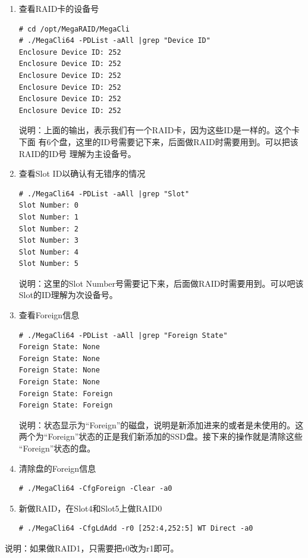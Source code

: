 \begin{enumerate}[itemsep=0pt,parsep=0pt]
\item 查看RAID卡的设备号
\small{
\begin{verbatim}
# cd /opt/MegaRAID/MegaCli
# ./MegaCli64 -PDList -aAll |grep "Device ID"
Enclosure Device ID: 252
Enclosure Device ID: 252 
Enclosure Device ID: 252
Enclosure Device ID: 252
Enclosure Device ID: 252
Enclosure Device ID: 252
\end{verbatim}
}
\normalsize

说明：上面的输出，表示我们有一个RAID卡，因为这些ID是一样的。这个卡下面
有6个盘，这里的ID号需要记下来，后面做RAID时需要用到。可以把该RAID的ID号
理解为主设备号。
	
\item 查看Slot ID以确认有无错序的情况
\small{
\begin{verbatim}
# ./MegaCli64 -PDList -aAll |grep "Slot"  
Slot Number: 0
Slot Number: 1
Slot Number: 2
Slot Number: 3
Slot Number: 4
Slot Number: 5
\end{verbatim}
}
\normalsize

说明：这里的Slot Number号需要记下来，后面做RAID时需要用到。可以吧该
Slot的ID理解为次设备号。
	
\item 查看Foreign信息
\small{
\begin{verbatim}
# ./MegaCli64 -PDList -aAll |grep "Foreign State"
Foreign State: None
Foreign State: None 
Foreign State: None
Foreign State: None
Foreign State: Foreign 
Foreign State: Foreign 
\end{verbatim}
}
\normalsize

说明：状态显示为“Foreign”的磁盘，说明是新添加进来的或者是未使用的。这
两个为“Foreign”状态的正是我们新添加的SSD盘。接下来的操作就是清除这些
“Foreign”状态的盘。
	
\item 清除盘的Foreign信息
\small{
\begin{verbatim}
# ./MegaCli64 -CfgForeign -Clear -a0
\end{verbatim}
}
\normalsize
	
\item 新做RAID，在Slot4和Slot5上做RAID0
\small{
\begin{verbatim}
# ./MegaCli64 -CfgLdAdd -r0 [252:4,252:5] WT Direct -a0
\end{verbatim}
}
\normalsize
\end{enumerate}

说明：如果做RAID1，只需要把r0改为r1即可。

